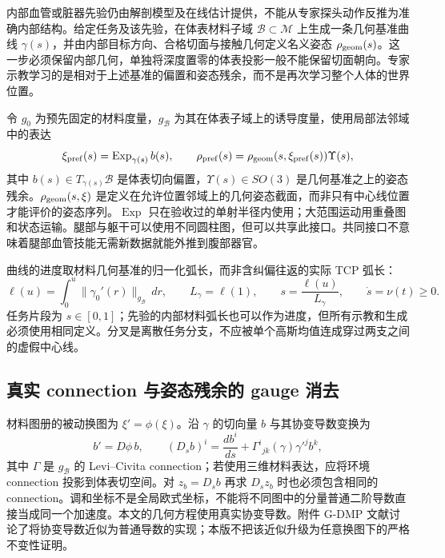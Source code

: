 \documentclass[11pt,a4paper]{article}
\numberwithin{equation}{section}
\theoremstyle{definition}
\begin{document}
内部血管或脏器先验仍由解剖模型及在线估计提供，不能从专家探头动作反推为准确内部结构。给定任务及该先验，在体表材料子域 $\mathcal B\subset\mathcal M$ 上生成一条几何基准曲线 $\gamma(s)$，并由内部目标方向、合格切面与接触几何定义名义姿态 $\rho_{\rm geom}(s)$。这一步必须保留内部几何，单独将深度置零的体表投影一般不能保留切面朝向。专家示教学习的是相对于上述基准的偏置和姿态残余，而不是再次学习整个人体的世界位置。

令 $g_0$ 为预先固定的材料度量，$g_{\mathcal B}$ 为其在体表子域上的诱导度量，使用局部法邻域中的表达
\begin{equation}
 \xi_{\rm pref}(s)=\operatorname{Exp}_{\gamma(s)} b(s),\qquad
 \rho_{\rm pref}(s)=\rho_{\rm geom}(s,\xi_{\rm pref}(s))\Upsilon(s),
 \label{eq:v43-skill-state}
\end{equation}
其中 $b(s)\in T_{\gamma(s)}\mathcal B$ 是体表切向偏置，$\Upsilon(s)\in SO(3)$ 是几何基准之上的姿态残余。$\rho_{\rm geom}(s,\xi)$ 是定义在允许位置邻域上的几何姿态截面，而非只有中心线位置才能评价的姿态序列。$\operatorname{Exp}$ 只在验收过的单射半径内使用；大范围运动用重叠图和状态运输。腿部与躯干可以使用不同圆柱图，但可以共享此接口。共同接口不意味着腿部血管技能无需新数据就能外推到腹部器官。

曲线的进度取材料几何基准的归一化弧长，而非含纠偏往返的实际 TCP 弧长：
\begin{equation}
 \ell(u)=\int_0^u\|\gamma_0'(r)\|_{g_{\mathcal B}}\,dr,\qquad
 L_\gamma=\ell(1),\qquad s=\frac{\ell(u)}{L_\gamma},\qquad
 \dot s=\nu(t)\ge0.
 \label{eq:v43-material-progress}
\end{equation}
任务片段为 $s\in[0,1]$；先验的内部材料弧长也可以作为进度，但所有示教和生成必须使用相同定义。分叉是离散任务分支，不应被单个高斯均值连成穿过两支之间的虚假中心线。

\subsection{真实 connection 与姿态残余的 gauge 消去}
材料图册的被动换图为 $\xi'=\phi(\xi)$。沿 $\gamma$ 的切向量 $b$ 与其协变导数变换为
\begin{equation}
 b'=D\phi\,b,\qquad
 (D_sb)^i=\frac{db^i}{ds}
 +\Gamma^i{}_{jk}(\gamma)\gamma'^j b^k,
 \label{eq:v43-coordinate-connection}
\end{equation}
其中 $\Gamma$ 是 $g_{\mathcal B}$ 的 Levi--Civita connection；若使用三维材料表达，应将环境 connection 投影到体表切空间。对 $z_b=D_sb$ 再求 $D_sz_b$ 时也必须包含相同的 connection。调和坐标不是全局欧式坐标，不能将不同图中的分量普通二阶导数直接当成同一个加速度。本文的几何方程使用真实协变导数。附件 G-DMP 文献讨论了将协变导数近似为普通导数的实现\cite{gdmp2024}；本版不把该近似升级为任意换图下的严格不变性证明。
\end{document}
